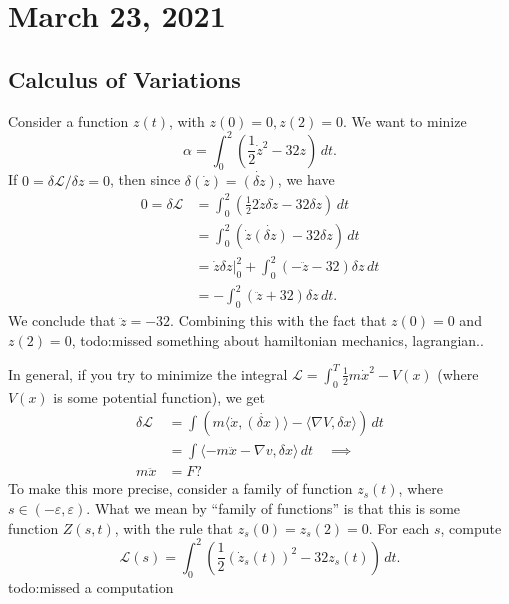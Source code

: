 \section{March 23, 2021}
\subsection{Calculus of Variations}
Consider a function $z(t)$, with $z(0)=0, z(2)=0$. We want to minize \[
    \alpha =\int_{0}^{2} \left( \frac{1}{2}\dot z^2-32z \right)  \, dt.
\] If $0= \delta \mathcal{L} /\delta z=0$, then since $\delta (\dot z)=\dot{ \left( \delta z \right) }$, we have
\begin{align*}
    0=\delta \mathcal{L} &= \int_{0}^{2} \left( \frac{1}{2}2\dot z \delta \dot z-32 \delta z \right)  \, dt\\
                       &= \int_{0}^{2} \left( \dot z \dot{\left( \delta z \right) } -32\delta z \right)  \, dt\\
                       &=\dot z \delta z \big|_0^2+\int_{0}^{2}(-\ddot z-32 )\delta z \, dt\\
                       &=-\int_{0}^{2} (\ddot z+32)\delta z \, dt.
\end{align*} We conclude that $\ddot z=-32$. Combining this with the fact that $z(0)=0$ and $z(2)=0$, {\color{red}todo:missed something about hamiltonian mechanics, lagrangian.}. 

In general, if you try to minimize the integral $\mathcal{L}=\int_{0}^{T} \frac{1}{2}m\dot x^2-V(x) $ (where $V(x)$ is some potential function), we get 
\begin{align*}
    \delta \mathcal{L} &= \int \left( m\langle \dot x,\dot{(\delta x)}   \rangle -\langle \nabla V,\delta x \rangle  \right)  \, dt\\
                       &=\int \langle -m\ddot x-\nabla v,\delta x \rangle  \, dt \quad \implies \\
    m\ddot x&=F?
\end{align*}
To make this more precise, consider a family of function $z_s(t)$, where $s \in (-\varepsilon ,\varepsilon ) .$ What we mean by ``family of functions'' is that this is some function $Z(s,t)$, with the rule that $z_s(0)=z_s(2)=0$. For each $s$, compute \[
    \mathcal{L} (s)=\int_{0}^{2} \left( \frac{1}{2}\left( \dot z_s(t) \right) ^2-32 z_s(t) \right) \, dt.
\] {\color{red}todo:missed a computation} 
